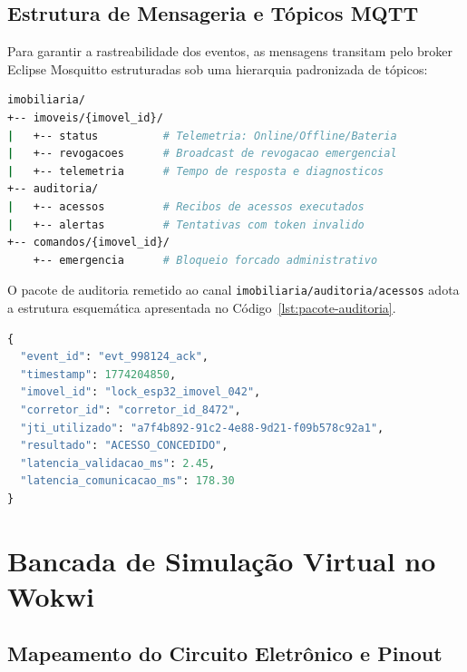 \subsection{Estrutura de Mensageria e Tópicos MQTT}
\label{subsec:topicos-mqtt}

Para garantir a rastreabilidade dos eventos, as mensagens transitam pelo broker Eclipse Mosquitto estruturadas sob uma hierarquia padronizada de tópicos:

\begin{lstlisting}[language=bash, caption={Estrutura hierárquica de tópicos MQTT empregada no sistema.}, label={lst:topicos-mqtt}]
imobiliaria/
+-- imoveis/{imovel_id}/
|   +-- status          # Telemetria: Online/Offline/Bateria
|   +-- revogacoes      # Broadcast de revogacao emergencial
|   +-- telemetria      # Tempo de resposta e diagnosticos
+-- auditoria/
|   +-- acessos         # Recibos de acessos executados
|   +-- alertas         # Tentativas com token invalido
+-- comandos/{imovel_id}/
    +-- emergencia      # Bloqueio forcado administrativo
\end{lstlisting}

O pacote de auditoria remetido ao canal \texttt{imobiliaria/auditoria/acessos} adota a estrutura esquemática apresentada no Código~\ref{lst:pacote-auditoria}.

\begin{lstlisting}[language=Python, caption={Formato esquemático do pacote de auditoria despachado via MQTT QoS 1.}, label={lst:pacote-auditoria}]
{
  "event_id": "evt_998124_ack",
  "timestamp": 1774204850,
  "imovel_id": "lock_esp32_imovel_042",
  "corretor_id": "corretor_id_8472",
  "jti_utilizado": "a7f4b892-91c2-4e88-9d21-f09b578c92a1",
  "resultado": "ACESSO_CONCEDIDO",
  "latencia_validacao_ms": 2.45,
  "latencia_comunicacao_ms": 178.30
}
\end{lstlisting}

\section{Bancada de Simulação Virtual no Wokwi}
\label{sec:bancada-simulacao}

\subsection{Mapeamento do Circuito Eletrônico e Pinout}
\label{subsec:circuito-wokwi}

